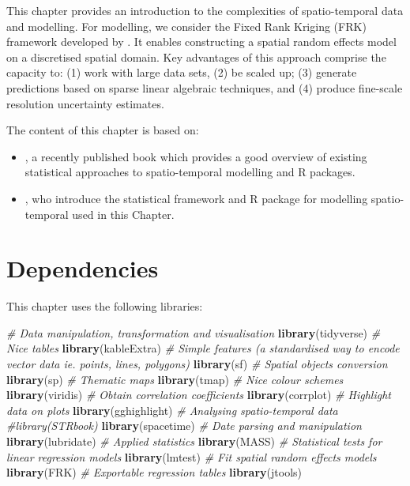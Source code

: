 \documentclass[
]{book}
\newenvironment{Shaded}{\begin{snugshade}}{\end{snugshade}}
\newcommand{\CommentTok}[1]{\textcolor[rgb]{0.56,0.35,0.01}{\textit{#1}}}
\newcommand{\KeywordTok}[1]{\textcolor[rgb]{0.13,0.29,0.53}{\textbf{#1}}}
\newcommand{\NormalTok}[1]{#1}
\begin{document}
This chapter provides an introduction to the complexities of spatio-temporal data and modelling. For modelling, we consider the Fixed Rank Kriging (FRK) framework developed by \citet{cressie2008fixed}. It enables constructing a spatial random effects model on a discretised spatial domain. Key advantages of this approach comprise the capacity to: (1) work with large data sets, (2) be scaled up; (3) generate predictions based on sparse linear algebraic techniques, and (4) produce fine-scale resolution uncertainty estimates.

The content of this chapter is based on:

\begin{itemize}
\item
  \citet{wikle2019spatio}, a recently published book which provides a good overview of existing statistical approaches to spatio-temporal modelling and R packages.
\item
  \citet{zammit2017frk}, who introduce the statistical framework and R package for modelling spatio-temporal used in this Chapter.
\end{itemize}

\hypertarget{dependencies-7}{%
\section{Dependencies}\label{dependencies-7}}

This chapter uses the following libraries:

\begin{Shaded}
\begin{Highlighting}[]
\CommentTok{# Data manipulation, transformation and visualisation}
\KeywordTok{library}\NormalTok{(tidyverse)}
\CommentTok{# Nice tables}
\KeywordTok{library}\NormalTok{(kableExtra)}
\CommentTok{# Simple features (a standardised way to encode vector data ie. points, lines, polygons)}
\KeywordTok{library}\NormalTok{(sf) }
\CommentTok{# Spatial objects conversion}
\KeywordTok{library}\NormalTok{(sp) }
\CommentTok{# Thematic maps}
\KeywordTok{library}\NormalTok{(tmap) }
\CommentTok{# Nice colour schemes}
\KeywordTok{library}\NormalTok{(viridis) }
\CommentTok{# Obtain correlation coefficients}
\KeywordTok{library}\NormalTok{(corrplot)}
\CommentTok{# Highlight data on plots}
\KeywordTok{library}\NormalTok{(gghighlight)}
\CommentTok{# Analysing spatio-temporal data}
\CommentTok{#library(STRbook)}
\KeywordTok{library}\NormalTok{(spacetime)}
\CommentTok{# Date parsing and manipulation}
\KeywordTok{library}\NormalTok{(lubridate)}
\CommentTok{# Applied statistics}
\KeywordTok{library}\NormalTok{(MASS)}
\CommentTok{# Statistical tests for linear regression models}
\KeywordTok{library}\NormalTok{(lmtest)}
\CommentTok{# Fit spatial random effects models}
\KeywordTok{library}\NormalTok{(FRK)}
\CommentTok{# Exportable regression tables}
\KeywordTok{library}\NormalTok{(jtools)}
\end{Highlighting}
\end{Shaded}
\end{document}
